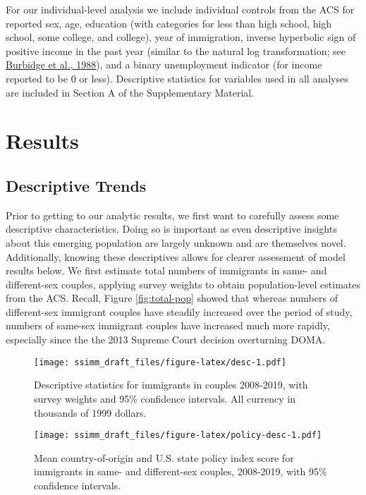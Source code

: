 \documentclass[
  12pt,
]{article}
\begin{document}
For our individual-level analysis we include individual controls from the ACS for reported sex, age, education (with categories for less than high school, high school, some college, and college), year of immigration, inverse hyperbolic sign of positive income in the past year (similar to the natural log transformation; see \protect\hyperlink{ref-burbidge_1988_alternative}{Burbidge et al., 1988}), and a binary unemployment indicator (for income reported to be 0 or less). Descriptive statistics for variables used in all analyses are included in Section A of the Supplementary Material.

\hypertarget{results}{%
\section{Results}\label{results}}

\hypertarget{descriptive-trends}{%
\subsection{Descriptive Trends}\label{descriptive-trends}}

Prior to getting to our analytic results, we first want to carefully assess some descriptive characteristics. Doing so is important as even descriptive insights about this emerging population are largely unknown and are themselves novel. Additionally, knowing these descriptives allows for clearer assessment of model results below. We first estimate total numbers of immigrants in same- and different-sex couples, applying survey weights to obtain population-level estimates from the ACS. Recall, Figure \ref{fig:total-pop} showed that whereas numbers of different-sex immigrant couples have steadily increased over the period of study, numbers of same-sex immigrant couples have increased much more rapidly, especially since the the 2013 Supreme Court decision overturning DOMA.

\begin{figure}
\centering
\texttt{[image: ssimm\_draft\_files/figure-latex/desc-1.pdf]}
\caption{\label{fig:desc}Descriptive statistics for immigrants in couples 2008-2019, with survey weights and 95\% confidence intervals. All currency in thousands of 1999 dollars.}
\end{figure}

\begin{figure}
\centering
\texttt{[image: ssimm\_draft\_files/figure-latex/policy-desc-1.pdf]}
\caption{\label{fig:policy-desc}Mean country-of-origin and U.S. state policy index score for immigrants in same- and different-sex couples, 2008-2019, with 95\% confidence intervals.}
\end{figure}
\end{document}
